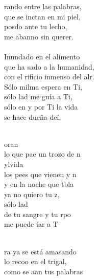 \documentclass[12pt]{article}
\begin{document}
\begin{multicols*}{2}
        \begin{cancion}%
            rando entre las palabras,\\
            que se inctan en mi piel,\\
            posdo ante tu lecho,\\
            me abanno sin querer.\\
            \jump\\
        Inundado en el alimento\\
            que ha sado a la humanidad,\\
            con el rificio inmenso del alr.\\
        \jump
            Sólo milma espera en Ti, \\
            sólo lad me guía a Ti, \\
            sólo en y por Ti la vida \\
            se hace dueña deí. \\\jump\\
            \begin{chorus}%
            oran \\
            lo que pae un trozo de n\\
            ylvida \\
            los pees que vienen y n \\
            y en la noche que tbla \\
            ya no quiero tu z, \\
            sólo lad \\
            de tu sangre y tu rpo  \\
            me puede iar a T\\
            \end{chorus}%
            \jump\\
        \jump
            ra ya se está amasando \\
            lo recoo en el trigal, \\
            como se aan tus palabras \\

\end{cancion}
\end{multicols*}
\end{document}
